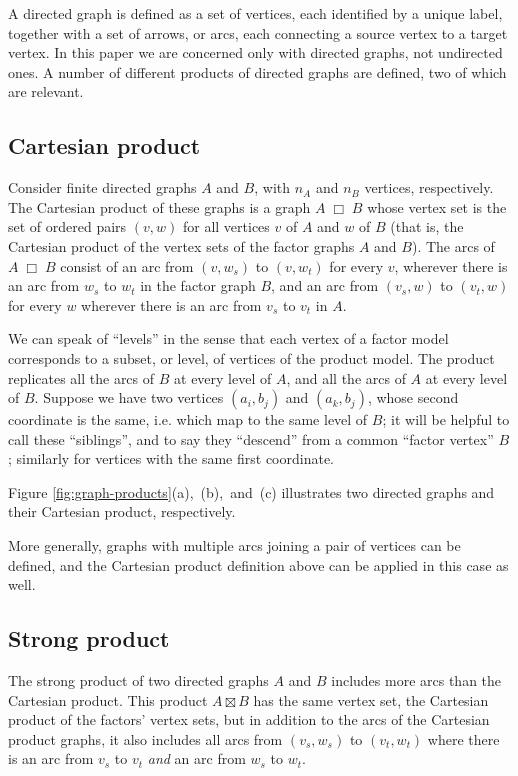 \documentclass[review]{elsarticle}
\newcommand{\hl}[1]{#1}
\newcommand{\cartprod}{\;\Box\;}
\begin{document}
A directed graph is defined as a set of vertices,
each identified by a unique label,
together with a set of arrows, or arcs,
each connecting a source vertex to a target vertex.
In this paper we are concerned only with directed graphs,
not undirected ones.
A number of different products of directed graphs are defined,
two of which are relevant.

\subsection{Cartesian product}
Consider finite directed graphs $A$ and $B$, with $n_A$ and
$n_B$ vertices, respectively.  
The Cartesian product of these graphs \cite{imrich-klavzar2000}
is a graph $A\cartprod B$ whose vertex set is the set of ordered pairs
$(v,w)$ for all vertices $v$ of $A$ and $w$ of $B$
(that is, the Cartesian product of the vertex sets of the
factor graphs $A$ and $B$).
The arcs of $A\cartprod B$ consist of an arc from
$(v,w_s)$ to $(v,w_t)$ for every $v$, wherever there is an
arc from $w_s$ to $w_t$ in the factor graph $B$,
and an arc from $(v_s,w)$ to $(v_t,w)$ for every $w$ 
wherever there is an arc from $v_s$ to $v_t$ in $A$.

We can speak of ``levels'' in the sense that each vertex of a
factor model corresponds to a subset, or level, of vertices of
the product model.
The product replicates all the arcs of $B$ at every level of $A$,
and all the arcs of $A$ at every level of $B$.
Suppose we have two vertices $(a_i, b_j)$ and $(a_k, b_j)$,
whose second coordinate is the same, i.e. which map
to the same level of $B$;
it will be helpful to call these ``siblings'',
and to say they ``descend'' from a common ``factor vertex''
$B$; similarly for vertices with the same first coordinate.

\hl{Figure \mbox{\ref{fig:graph-products}}(a),~(b),~and~(c)}
illustrates two directed graphs and their Cartesian product,
respectively.

More generally, graphs with multiple arcs joining a pair of vertices
can be defined,
and the Cartesian product definition
above can be applied in this case as well.

\subsection{Strong product}

The strong product of two directed graphs $A$ and $B$
includes more arcs than the Cartesian product\cite{imrich-klavzar2000}.
This product $A\boxtimes B$ has the same vertex set,
the Cartesian product of the factors' vertex sets,
but in addition to the arcs of the Cartesian product graphs,
it also includes all arcs from $(v_s,w_s)$ to $(v_t,w_t)$
where there is an arc from $v_s$ to $v_t$ \emph{and} an arc
from $w_s$ to $w_t$.
\end{document}
